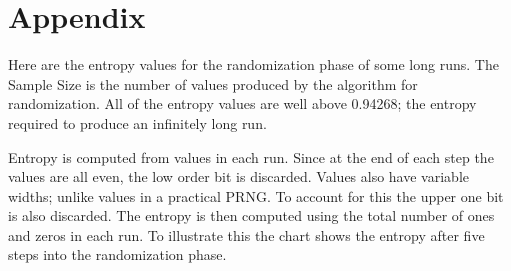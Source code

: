 \documentclass[letterpaper]{article}
\begin{document}
\onecolumn

\appendix

\section*{Appendix}

Here are the entropy values for the randomization phase of some long runs. The Sample Size is the number of values produced by the algorithm for randomization. All of the entropy values are well above 0.94268; the entropy required to produce an infinitely long run.

Entropy is computed from values in each run. Since at the end of each step the values are all even, the low order bit is discarded. Values also have variable widths; unlike values in a practical PRNG. To account for this the upper one bit is also discarded. The entropy is then computed using the total number of ones and zeros in each run. To illustrate this the chart shows the entropy after five steps into the randomization phase. 
\end{document}
